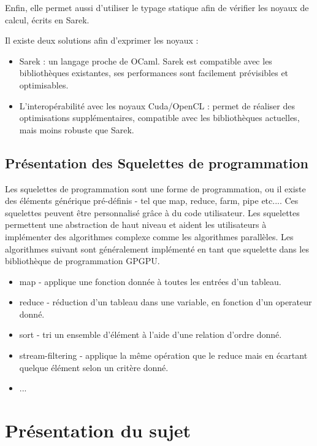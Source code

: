 \documentclass{report}
\begin{document}
Enfin, elle permet aussi d’utiliser le typage statique afin de vérifier les noyaux de calcul, écrits en Sarek.

Il existe deux solutions afin d’exprimer les noyaux :
\begin{itemize}

\item Sarek : un langage proche de OCaml. Sarek est compatible avec les bibliothèques existantes, ses performances sont facilement prévisibles et optimisables.

\item L’interopérabilité avec les noyaux Cuda/OpenCL : permet de réaliser des optimisations supplémentaires, compatible avec les bibliothèques actuelles, mais moins robuste que Sarek.


\end{itemize}

\section{Présentation des Squelettes de programmation}
Les squelettes de programmation sont une forme de programmation, ou il existe des éléments générique pré-définis - tel que map, reduce, farm, pipe etc.... Ces squelettes peuvent être personnalisé grâce à du code utilisateur. 
Les squelettes permettent une abstraction de haut niveau et aident les utilisateurs à implémenter des algorithmes complexe comme les algorithmes parallèles. Les algorithmes suivant sont généralement implémenté en tant que squelette dans les bibliothèque de programmation GPGPU.

\begin{itemize}
\item map - applique une fonction donnée à toutes les entrées d’un tableau.
\item reduce - réduction d’un tableau dans une variable, en fonction d’un operateur donné.
\item sort - tri un ensemble d’élément à l’aide d’une relation d’ordre donné.
\item stream-filtering - applique la même opération que le reduce mais en écartant quelque élément selon un critère donné.
\item ...
\end{itemize}

\chapter{Présentation du sujet}
\end{document}
